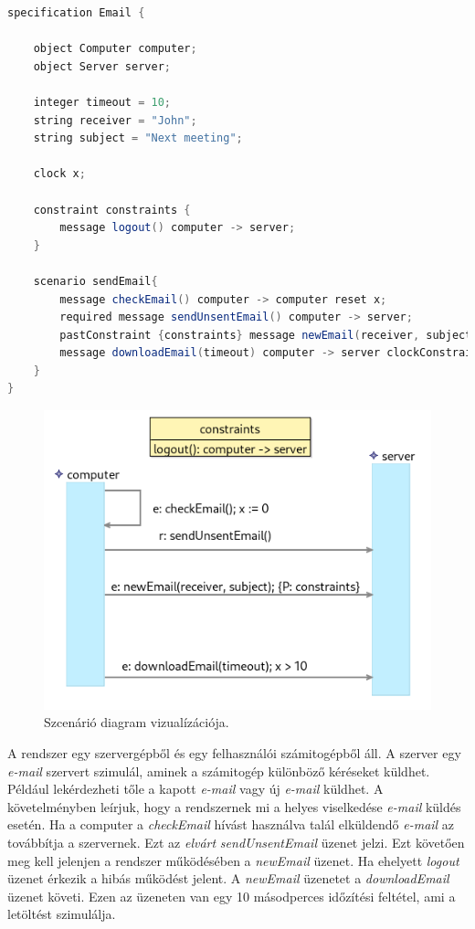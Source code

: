 \begin{lstlisting}[language=java, frame=single, float=ht!, caption={Integrációs tesztesethez tartozó szcenárió szöveges leírása.},captionpos=b,label=example_test_scenario]
specification Email {

	object Computer computer;
	object Server server;

	integer timeout = 10;
	string receiver = "John";
	string subject = "Next meeting";

	clock x;

	constraint constraints {
		message logout() computer -> server;
	}

	scenario sendEmail{
		message checkEmail() computer -> computer reset x;
		required message sendUnsentEmail() computer -> server;
		pastConstraint {constraints} message newEmail(receiver, subject) computer -> server;
		message downloadEmail(timeout) computer -> server clockConstraint {>(x,10)};
	}
}
\end{lstlisting}

\begin{figure}[!ht]
    \centering
    \includegraphics[width=150mm, keepaspectratio]{figures/diagramExample.png}
    \caption{Szcenárió diagram vizualízációja.}
    \label{example_test_scenario_diagram}
\end{figure}

A rendszer egy szervergépből és egy felhasználói számitogépből áll.
A szerver egy \textit{e-mail} szervert szimulál, aminek a számitogép különböző kéréseket küldhet.
Például lekérdezheti tőle a kapott \textit{e-mail} vagy új \textit{e-mail} küldhet.
A követelményben leírjuk, hogy a rendszernek mi a helyes viselkedése \textit{e-mail} küldés esetén.
Ha a computer a \textit{checkEmail} hívást használva talál elküldendő \textit{e-mail} az továbbítja a szervernek.
Ezt az \textit{elvárt} \textit{sendUnsentEmail} üzenet jelzi.
Ezt követően meg kell jelenjen a rendszer működésében a \textit{newEmail} üzenet.
Ha ehelyett \textit{logout} üzenet érkezik a hibás működést jelent.
A \textit{newEmail} üzenetet a \textit{downloadEmail} üzenet követi.
Ezen az üzeneten van egy 10 másodperces időzítési feltétel, ami a letöltést szimulálja.

